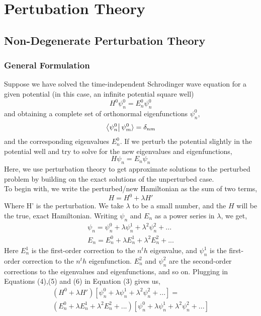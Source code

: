 \chapter{Pertubation Theory}
\section{Non-Degenerate Perturbation Theory}
\subsection{General Formulation}
Suppose we have solved the time-independent Schrodinger wave equation for a given potential (in this case, an infinite potential square well)
\begin{equation}
H^0\psi_{n}^0=E^{0}_{n}\psi_{n}^0
\end{equation}
and obtaining a complete set of orthonormal eigenfunctions $\psi_{n}^0$,
\begin{equation}
\bra{\psi_{n}^0}{\psi_{m}^0}\rangle=\delta_{nm}
\end{equation}
and the corresponding eigenvalues $E^0_n$. If we perturb the potential slightly in the potential well and try to solve for the new eigenvalues and eigenfunctions, 
\begin{equation}
H\psi_n=E_n\psi_n
\end{equation}
Here, we use perturbation theory to get approximate solutions to the perturbed problem by building on the exact solutions of the unperturbed case.\\
To begin with, we write the perturbed/new Hamiltonian as the sum of two terms,
\begin{equation}
H=H^0+\lambda H'
\end{equation}
Where H' is the perturbation. We take $\lambda$ to be a small number, and the $H$ will be the true, exact Hamiltonian. Writing $\psi_n$ and $E_n$ as a power series in $\lambda$, we get,
\begin{gather}
\psi_{n}=\psi_{n}^0 + \lambda \psi_{n}^1 + \lambda^2 \psi_{n}^2+... \\
E_n= E^0_n + \lambda E^1_n + \lambda^2 E^2_n+...
\end{gather}
Here $E^1_n$ is the first-order correction to the $n^th$ eigenvalue, and $\psi_{n}^1$ is the first-order correction to the $n^th$ eigenfunction. $E^2_n$ and $\psi_{n}^2$ are the second-order corrections to the eigenvalues and eigenfunctions, and so on. Plugging in Equations (4),(5) and (6) in Equation (3) gives us,
\begin{multline}
(H^0+\lambda H')[\psi_{n}^0 + \lambda \psi_{n}^1 + \lambda^2 \psi_{n}^2+... ]=\\( E^0_n + \lambda E^1_n + \lambda^2 E^2_n+...)[\psi_{n}^0 + \lambda \psi_{n}^1 + \lambda^2 \psi_{n}^2+...]
\end{multline}
